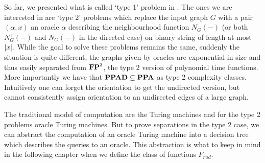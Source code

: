 So far, we presented what is called `type 1' problem in \cite{beame1995rel}. The ones we are interested in are `type 2' problems which replace the input graph $G$ with a pair $(\alpha,x)$ an oracle $\alpha$ describing the neighbourhood function $N_G(-)$ (or both $N_G^+(-)$ and $N_G^-(-)$ in the directed case) on binary string of length at most $\left|{x}\right|$. While the goal to solve these problems remains the same, suddenly the situation is quite different, the graphs given by oracles are exponential in size and thus easily separated from $\textbf{FP}^2$, the type 2 version of polynomial time functions. More importantly we have that $\textbf{PPAD}\subsetneq \textbf{PPA}$ as type 2 complexity classes. Intuitively one can forget the orientation to get the undirected version, but cannot consistently assign orientation to an undirected edges of a large graph.

The traditional model of computation are the Turing machines and for the type 2 problems oracle Turing machines. But to prove separations in the type 2 case, we can abstract the computation of an oracle Turing machine into a decision tree which describes the queries to an oracle. This abstraction is what to keep in mind in the following chapter when we define the class of functions $F_{rud}$.
